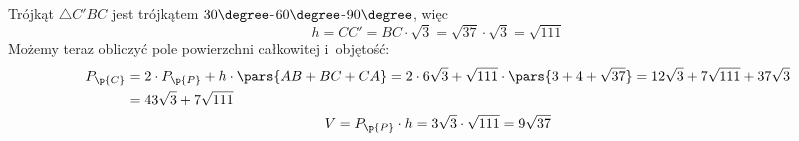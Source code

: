 \noindent
Trójkąt \(\triangle{C'BC}\) jest trójkątem \(30\degree\)-\(60\degree\)-\(90\degree\), więc
\begin{equation*}
    h = CC' = BC \cdot \sqrt{3}
    = \sqrt{37} \cdot \sqrt{3}
    = \sqrt{111}
\end{equation*}
Możemy teraz obliczyć pole powierzchni całkowitej i~objętość:
\begin{gather*}
    \begin{split}
        P_\p{C}
        &= 2 \cdot P_\p{P} + h \cdot \pars{AB + BC + CA}
        = 2 \cdot 6\sqrt{3} + \sqrt{111} \cdot \pars{3 + 4 + \sqrt{37}}
        = 12\sqrt{3} + 7\sqrt{111} + 37\sqrt{3}\\
        &= 43\sqrt{3} + 7\sqrt{111}
    \end{split}\\
    \begin{split}
        V
        = P_\p{P} \cdot h
        = 3\sqrt{3} \cdot \sqrt{111}
        = 9\sqrt{37}
    \end{split}
\end{gather*}

